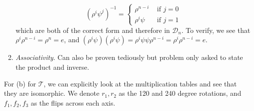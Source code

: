 \begin{solution}
\begin{enumerate}
\begin{equation}
        (\rho^i \psi^j)^{-1} = \begin{cases} 
          \rho^{n - i} & \text{ if } j = 0  \\
          \rho^{i} \psi & \text{ if } j = 1
        \end{cases}
      \end{equation}
      which are both of the correct form and therefore in $\mathcal{D}_n$. To verify, we see that $\rho^i \rho^{n-i} = \rho^n = e$, and $(\rho^i \psi) (\rho^i \psi) = \rho^i \psi \psi \rho^{n-i} = \rho^i \rho^{n-i} = e$.  
      \item \textit{Associativity}. Can also be proven tediously but problem only asked to state the product and inverse.  
    \end{enumerate} 

    For (b) for $\mathcal{T}$, we can explicitly look at the multiplication tables and see that they are isomorphic. We denote $r_1, r_2$ as the 120 and 240 degree rotations, and $f_1, f_2, f_3$ as the flips across each axis. 


\end{solution}
